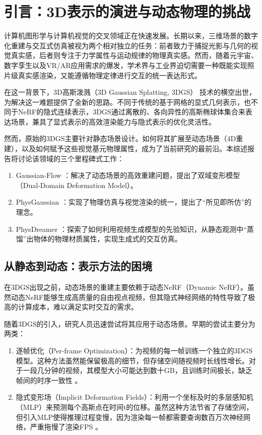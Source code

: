 \chapter{引言：3D表示的演进与动态物理的挑战}

计算机图形学与计算机视觉的交叉领域正在快速发展。长期以来，三维场景的数字化重建与交互式仿真被视为两个相对独立的任务：前者致力于捕捉光影与几何的视觉真实感，后者则专注于力学属性与运动规律的物理真实感。然而，随着元宇宙、数字孪生以及VR/AR应用需求的爆发，学术界与工业界迫切需要一种既能实现照片级真实感渲染，又能遵循物理定律进行交互的统一表达形式。

在这一背景下，3D高斯泼溅（3D Gaussian Splatting, 3DGS）\cite{wu2025survey} 技术的横空出世，为解决这一难题提供了全新的思路。不同于传统的基于网格的显式几何表示，也不同于NeRF的隐式连续表示，3DGS通过离散的、各向异性的高斯椭球体集合来表达场景，兼具了显式表示的高效渲染能力与隐式表示的优化灵活性。

然而，原始的3DGS主要针对静态场景设计。如何将其扩展至动态场景（4D重建），以及如何赋予这些视觉基元物理属性，成为了当前研究的最前沿。本综述报告将讨论该领域的三个里程碑式工作：

\begin{enumerate}
    \item Gaussian-Flow \cite{lin2024gaussianflow_cvpr}：解决了动态场景的高效重建问题，提出了双域变形模型（Dual-Domain Deformation Model）。
    \item PhysGaussian \cite{xie2024physgaussian_cvpr}：实现了物理仿真与视觉渲染的统一，提出了“所见即所仿”的理念。
    \item PhysDreamer \cite{li2024physdreamer_arxiv}：探索了如何利用视频生成模型的先验知识，从静态观测中“蒸馏”出物体的物理材质属性，实现生成式的交互仿真。
\end{enumerate}

\section{从静态到动态：表示方法的困境}

在3DGS出现之前，动态场景的重建主要依赖于动态NeRF（Dynamic NeRF）。虽然动态NeRF能够生成高质量的自由视点视频，但其隐式神经网络的特性导致了极高的计算成本，难以满足实时交互的需求。

随着3DGS的引入，研究人员迅速尝试将其应用于动态场景。早期的尝试主要分为两类：

\begin{enumerate}
    \item 逐帧优化（Per-frame Optimization）：为视频的每一帧训练一个独立的3DGS模型。这种方法虽然能保留极高的细节，但存储空间随视频时长线性增长。对于一段几分钟的视频，其模型大小可能达到数十GB，且训练时间极长，缺乏帧间的时序一致性 \cite{lin2024gaussianflow_cvpr}。
    \item 隐式变形场（Implicit Deformation Fields）：利用一个坐标及时的多层感知机（MLP）来预测每个高斯点在时间t的位移。虽然这种方法节省了存储空间，但引入MLP使得推理过程变慢，因为渲染每一帧都需要查询数百万次神经网络，严重拖慢了渲染FPS \cite{lin2024gaussianflow_cvpr}。
\end{enumerate}

